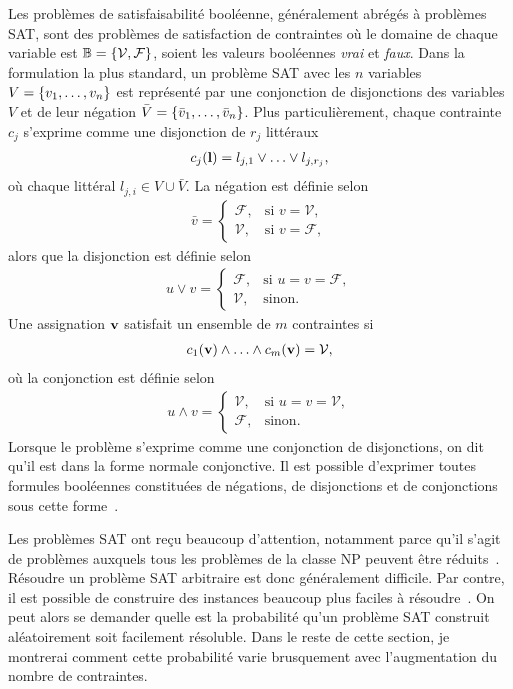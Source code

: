 Les problèmes de satisfaisabilité booléenne,
généralement abrégés à problèmes SAT,
sont des problèmes de satisfaction de contraintes où le domaine de chaque variable
est $\mathbb B = \qty{\mathcal V, \mathcal F}$,
soient les valeurs booléennes \textit{vrai} et \textit{faux}.
Dans la formulation la plus standard,
un problème SAT avec les $n$ variables $V = \qty{v_1,\ldots, v_n}$
est représenté par une conjonction de disjonctions des variables $V$ et de leur négation 
$\bar V = \qty{\bar v_1, \ldots, \bar v_n}$.
Plus particulièrement,
chaque contrainte $c_j$ s'exprime comme une disjonction de $r_j$ littéraux
\begin{align}
  c_j(\vb l) = l_{j, 1} \lor \ldots \lor l_{j, r_{j}},
\end{align}
où chaque littéral $l_{j, i} \in V \cup \bar V$.
La négation est définie selon
\begin{align}
  \bar v = 
  \begin{cases}
    \mathcal F, &\text{si } v = \mathcal V, \\
    \mathcal V, &\text{si } v = \mathcal F,
  \end{cases}
\end{align}
alors que la disjonction est définie selon
\begin{align}
  u \lor v = 
  \begin{cases}
    \mathcal F, &\text{si } u = v = \mathcal F, \\
    \mathcal V, &\text{sinon}.
  \end{cases}
\end{align}
Une assignation $\vb v$ satisfait un ensemble de $m$ contraintes si
\begin{align}
  c_1(\vb v) \land \ldots \land c_m(\vb v) = \mathcal V,
\end{align}
où la conjonction est définie selon
\begin{align}
  u \land v = 
  \begin{cases}
    \mathcal V, &\text{si } u = v = \mathcal V, \\
    \mathcal F, &\text{sinon}.
  \end{cases}
\end{align}
Lorsque le problème s'exprime comme une conjonction de disjonctions,
on dit qu'il est dans la forme normale conjonctive.
Il est possible d'exprimer toutes formules booléennes constituées de négations,
de disjonctions et de conjonctions sous cette forme~\cite{tseitin_complexity_1983}.

Les problèmes SAT ont reçu beaucoup d’attention,
notamment parce qu’il s’agit de problèmes auxquels tous les problèmes de la classe NP
peuvent être réduits~\cite{cook_complexity_1971}.
Résoudre un problème SAT arbitraire est donc généralement difficile.
Par contre, il est possible de construire des instances beaucoup
plus faciles à résoudre~\cite{cheeseman_where_1991}.
On peut alors se demander quelle est la probabilité qu’un problème SAT construit
aléatoirement soit facilement résoluble.
Dans le reste de cette section, je montrerai comment cette probabilité varie brusquement
avec l’augmentation du nombre de contraintes.

